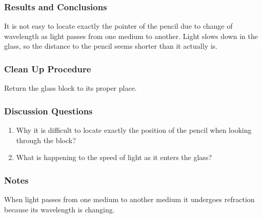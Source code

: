 \subsubsection*{Results and Conclusions}
It is not easy to locate exactly the pointer of the pencil due to change of wavelength as light passes from one medium to another. Light slows down in the glass, so the distance to the pencil seems shorter than it actually is.  

\subsubsection*{Clean Up Procedure}
Return the glass block to its proper place.

\subsubsection*{Discussion Questions}
\begin{enumerate}
\item{Why it is difficult to locate exactly the position of the pencil when looking through the block?}
\item{What is happening to the speed of light as it enters the glass?}
\end{enumerate}

\subsubsection*{Notes}
When light passes from one medium to another medium it undergoes refraction because its wavelength is changing.
